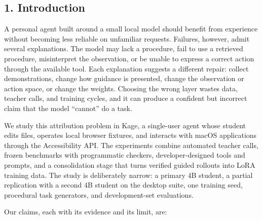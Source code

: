 \documentclass[
  10pt,
]{article}
\begin{document}
\subsection{1. Introduction}\label{introduction}

A personal agent built around a small local model should benefit from
experience without becoming less reliable on unfamiliar requests.
Failures, however, admit several explanations. The model may lack a
procedure, fail to use a retrieved procedure, misinterpret the
observation, or be unable to express a correct action through the
available tool. Each explanation suggests a different repair: collect
demonstrations, change how guidance is presented, change the observation
or action space, or change the weights. Choosing the wrong layer wastes
data, teacher calls, and training cycles, and it can produce a confident
but incorrect claim that the model ``cannot'' do a task.

We study this attribution problem in Kage, a single-user agent whose
student edits files, operates local browser fixtures, and interacts with
macOS applications through the Accessibility API. The experiments
combine automated teacher calls, frozen benchmarks with programmatic
checkers, developer-designed tools and prompts, and a consolidation
stage that turns verified guided rollouts into LoRA training data. The
study is deliberately narrow: a primary 4B student, a partial
replication with a second 4B student on the desktop suite, one training
seed, procedural task generators, and development-set evaluations.

Our claims, each with its evidence and its limit, are:
\end{document}
